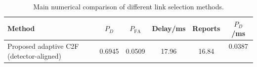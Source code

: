 \begin{table}[t]
    \centering
    \caption{Main numerical comparison of different link selection methods.}
    \label{tab:main_summary}
    \begin{tabular}{l c c c c c}
        \hline
        Method & $P_D$ & $P_{\mathrm{FA}}$ & Delay/ms & Reports & $P_D$/ms \\
        \hline
        Proposed adaptive C2F (detector-aligned) & 0.6945 & 0.0509 & 17.96 & 16.84 & 0.0387 \
        \hline
    \end{tabular}
\end{table}
